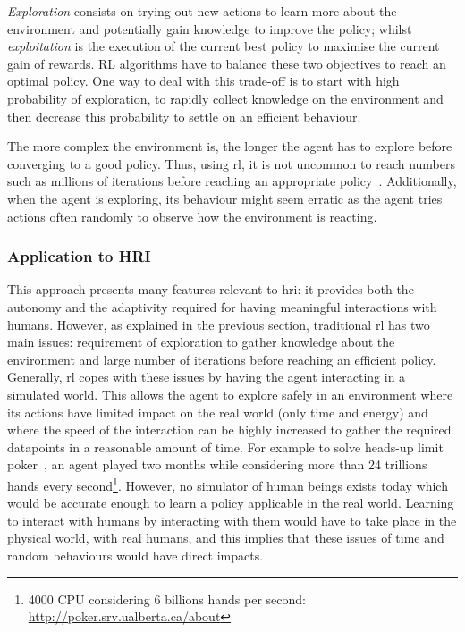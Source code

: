 \emph{Exploration} consists on trying out new actions to learn more about the environment and potentially gain knowledge to improve the policy; whilst \emph{exploitation} is the execution of the current best policy to maximise the current gain of rewards. RL algorithms have to balance these two objectives to reach an optimal policy. One way to deal with this trade-off is to start with high probability of exploration, to rapidly collect knowledge on the environment and then decrease this probability to settle on an efficient behaviour.

The more complex the environment is, the longer the agent has to explore before converging to a good policy. Thus, using \gls{rl}, it is not uncommon to reach numbers such as millions of iterations before reaching an appropriate policy~\citep{sutton1998reinforcement}. Additionally, when the agent is exploring, its behaviour might seem erratic as the agent tries actions often randomly to observe how the environment is reacting.

\subsubsection{Application to HRI}

This approach presents many features relevant to \gls{hri}: it provides both the autonomy and the adaptivity required for having meaningful interactions with humans. However, as explained in the previous section, traditional \gls{rl} has two main issues: requirement of exploration to gather knowledge about the environment and large number of iterations before reaching an efficient policy. Generally, \gls{rl} copes with these issues by having the agent interacting in a simulated world. This allows the agent to explore safely in an environment where its actions have limited impact on the real world (only time and energy) and where the speed of the interaction can be highly increased to gather the required datapoints in a reasonable amount of time. For example to solve heads-up limit poker~\citep{bowling2015heads}, an agent played two months while considering more than 24 trillions hands every second\footnote{4000 CPU considering 6 billions hands per second: \url{http://poker.srv.ualberta.ca/about}}. However, no simulator of human beings exists today which would be accurate enough to learn a policy applicable in the real world. Learning to interact with humans by interacting with them would have to take place in the physical world, with real humans, and this implies that these issues of time and random behaviours would have direct impacts. 

